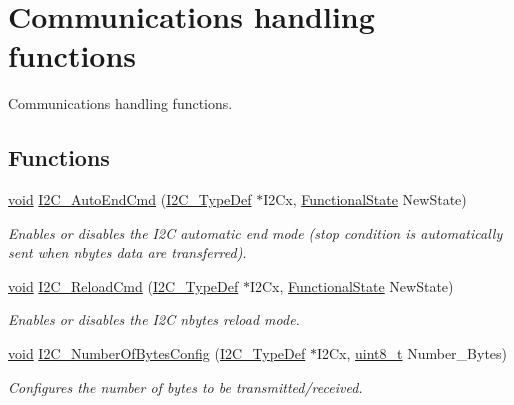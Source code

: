 \hypertarget{group___i2_c___group2}{\section{Communications handling functions}
\label{group___i2_c___group2}
}


Communications handling functions.  


\subsection*{Functions}
\begin{DoxyCompactItemize}
\item 
\hyperlink{group___n_a_m_e_ga18028b8badbf1ea7e704ccac3c488e82}{void} \hyperlink{group___i2_c___group2_gae6d72a57125adcf57285d3753a2d09d3}{I2\-C\-\_\-\-Auto\-End\-Cmd} (\hyperlink{struct_i2_c___type_def}{I2\-C\-\_\-\-Type\-Def} $\ast$I2\-Cx, \hyperlink{group___exported__types_gac9a7e9a35d2513ec15c3b537aaa4fba1}{Functional\-State} New\-State)
\begin{DoxyCompactList}\small\item\em Enables or disables the I2\-C automatic end mode (stop condition is automatically sent when nbytes data are transferred). \end{DoxyCompactList}\item 
\hyperlink{group___n_a_m_e_ga18028b8badbf1ea7e704ccac3c488e82}{void} \hyperlink{group___i2_c___group2_ga70c69dd900de88e71a25f860647f1369}{I2\-C\-\_\-\-Reload\-Cmd} (\hyperlink{struct_i2_c___type_def}{I2\-C\-\_\-\-Type\-Def} $\ast$I2\-Cx, \hyperlink{group___exported__types_gac9a7e9a35d2513ec15c3b537aaa4fba1}{Functional\-State} New\-State)
\begin{DoxyCompactList}\small\item\em Enables or disables the I2\-C nbytes reload mode. \end{DoxyCompactList}\item 
\hyperlink{group___n_a_m_e_ga18028b8badbf1ea7e704ccac3c488e82}{void} \hyperlink{group___i2_c___group2_gadb132a771d37a34ae158f5e7ccefd0e8}{I2\-C\-\_\-\-Number\-Of\-Bytes\-Config} (\hyperlink{struct_i2_c___type_def}{I2\-C\-\_\-\-Type\-Def} $\ast$I2\-Cx, \hyperlink{stdint_8h_aba7bc1797add20fe3efdf37ced1182c5}{uint8\-\_\-t} Number\-\_\-\-Bytes)
\begin{DoxyCompactList}\small\item\em Configures the number of bytes to be transmitted/received. \end{DoxyCompactList}\item 

\end{DoxyCompactItemize}
